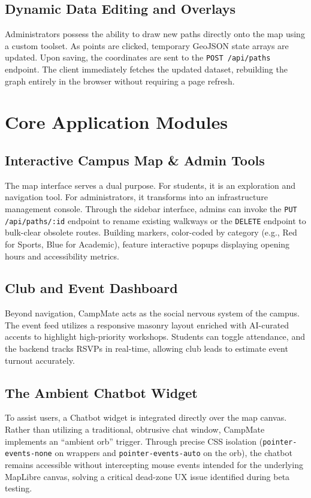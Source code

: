 \documentclass[conference]{IEEEtran}
\begin{document}
\subsection{Dynamic Data Editing and Overlays}
Administrators possess the ability to draw new paths directly onto the map using a custom toolset. As points are clicked, temporary GeoJSON state arrays are updated. Upon saving, the coordinates are sent to the \texttt{POST /api/paths} endpoint. The client immediately fetches the updated dataset, rebuilding the graph entirely in the browser without requiring a page refresh.

\section{Core Application Modules}

\subsection{Interactive Campus Map \& Admin Tools}
The map interface serves a dual purpose. For students, it is an exploration and navigation tool. For administrators, it transforms into an infrastructure management console. Through the sidebar interface, admins can invoke the \texttt{PUT /api/paths/:id} endpoint to rename existing walkways or the \texttt{DELETE} endpoint to bulk-clear obsolete routes. Building markers, color-coded by category (e.g., Red for Sports, Blue for Academic), feature interactive popups displaying opening hours and accessibility metrics.

\subsection{Club and Event Dashboard}
Beyond navigation, CampMate acts as the social nervous system of the campus. The event feed utilizes a responsive masonry layout enriched with AI-curated accents to highlight high-priority workshops. Students can toggle attendance, and the backend tracks RSVPs in real-time, allowing club leads to estimate event turnout accurately.

\subsection{The Ambient Chatbot Widget}
To assist users, a Chatbot widget is integrated directly over the map canvas. Rather than utilizing a traditional, obtrusive chat window, CampMate implements an ``ambient orb'' trigger. Through precise CSS isolation (\texttt{pointer-events-none} on wrappers and \texttt{pointer-events-auto} on the orb), the chatbot remains accessible without intercepting mouse events intended for the underlying MapLibre canvas, solving a critical dead-zone UX issue identified during beta testing.
\end{document}
